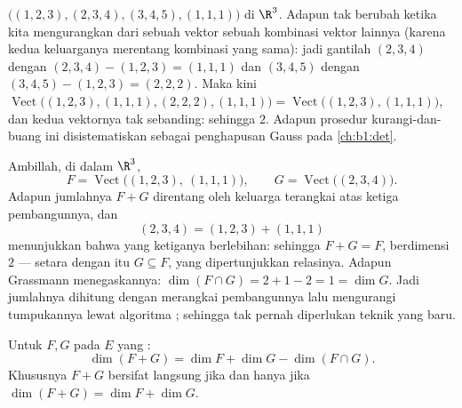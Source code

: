 \begin{example}
\label{ex:b1:findim:rankcomputation}
 $\bigl((1,2,3), (2,3,4), (3,4,5), (1,1,1)\bigr)$ di
$\R^3$. Adapun  tak berubah ketika kita mengurangkan dari sebuah vektor sebuah
kombinasi vektor lainnya (karena kedua keluarganya merentang kombinasi yang
sama): jadi gantilah $(2,3,4)$ dengan $(2,3,4) - (1,2,3) = (1,1,1)$
dan $(3,4,5)$ dengan $(3,4,5) - (1,2,3) = (2,2,2)$. Maka  kini
$\operatorname{Vect}\bigl((1,2,3), (1,1,1), (2,2,2),
(1,1,1)\bigr) = \operatorname{Vect}\bigl((1,2,3), (1,1,1)\bigr)$,
dan kedua vektornya tak sebanding: sehingga  $2$. Adapun
prosedur kurangi-dan-buang ini disistematiskan sebagai penghapusan
Gauss pada \cref{ch:b1:det}.
\end{example}

\begin{example}
\label{ex:b1:findim:sumconcat}
Ambillah, di dalam $\R^3$,
\[
F = \operatorname{Vect}\bigl((1,2,3),\ (1,1,1)\bigr),
\qquad
G = \operatorname{Vect}\bigl((2,3,4)\bigr) .
\]
Adapun jumlahnya $F + G$ direntang oleh keluarga terangkai atas ketiga
pembangunnya, dan
\[
(2, 3, 4) = (1, 2, 3) + (1, 1, 1)
\]
menunjukkan bahwa yang ketiganya berlebihan: sehingga $F + G = F$, berdimensi $2$ ---
setara dengan itu $G \subseteq F$, yang dipertunjukkan relasinya.
Adapun Grassmann menegaskannya: $\dim(F \cap G) = 2 + 1 - 2 = 1 = \dim G$.
Jadi jumlahnya dihitung dengan merangkai pembangunnya lalu mengurangi
tumpukannya lewat algoritma ; sehingga tak pernah diperlukan teknik yang baru.
\end{example}

\begin{theorem}\label{thm:b1:findim:grassmann}
Untuk  $F, G$ pada $E$ yang :
\[
\dim(F + G) = \dim F + \dim G - \dim(F \cap G) .
\]
Khususnya $F + G$ bersifat langsung jika dan hanya jika $\dim(F + G) = \dim F + \dim G$.
\end{theorem}

